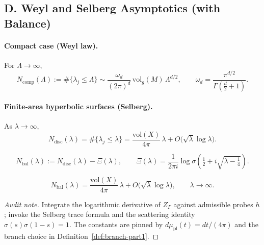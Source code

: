 
\subsection*{D. Weyl and Selberg Asymptotics (with Balance)}
\label{subsec:weyl-selberg-part1}

\paragraph{Compact case (Weyl law).} For $\Lambda\to\infty$,
\begin{equation}
  N_{\mathrm{comp}}(\Lambda):=\#\{\lambda_j\le \Lambda\}
  \sim \frac{\omega_d}{(2\pi)^d}\,\mathrm{vol}_g(M)\,\Lambda^{d/2},
  \qquad \omega_d=\frac{\pi^{d/2}}{\Gamma(\frac d2+1)}.
  \label{eq:weyl-part1}
\end{equation}

\paragraph{Finite-area hyperbolic surfaces (Selberg).} As $\lambda\to\infty$,
\begin{equation}
  N_{\mathrm{disc}}(\lambda)=\#\{\lambda_j\le \lambda\}
  = \frac{\mathrm{vol}(X)}{4\pi}\,\lambda + O\!\big(\sqrt{\lambda}\log\lambda\big).
  \label{eq:selberg-unbalanced-part1}
\end{equation}

\begin{definition}
\label{def:balanced-counting-part1}
\[
  N_{\mathrm{bal}}(\lambda):= N_{\mathrm{disc}}(\lambda)-\Xi(\lambda),\qquad
  \Xi(\lambda)=\frac{1}{2\pi i}\log \sigma\!\left(\tfrac12+i\sqrt{\lambda-\tfrac14}\right).
\]
\end{definition}

\begin{theorem}
\label{thm:balanced-selberg-part1}
\[
  N_{\mathrm{bal}}(\lambda)
  =\frac{\mathrm{vol}(X)}{4\pi}\,\lambda + O\!\big(\sqrt{\lambda}\log\lambda\big),\qquad \lambda\to\infty.
\]
\end{theorem}

\begin{proof}[Audit note]
Integrate the logarithmic derivative of $Z_\Gamma$ against admissible probes $h$; invoke the Selberg trace formula and the scattering identity $\sigma(s)\sigma(1-s)=1$. The constants are pinned by $d\mu_{\mathrm{pl}}(t)=dt/(4\pi)$ and the branch choice in Definition~\ref{def:branch-part1}.
\end{proof}

